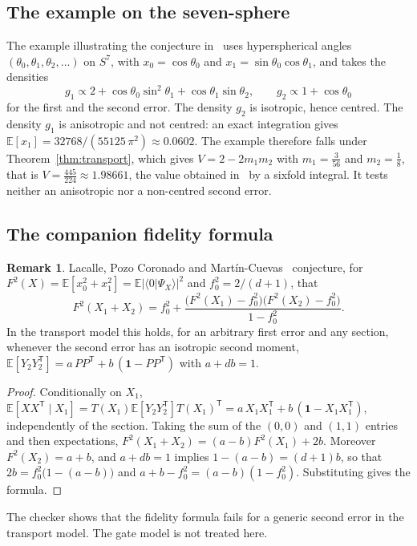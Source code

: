 \documentclass[11pt,a4paper]{article}
\theoremstyle{definition}
\newtheorem{remark}[theorem]{Remark}
\theoremstyle{plain}
\newcommand{\one}{\mathbf{1}}
\newcommand{\E}{\mathbb{E}}
\newcommand{\T}{\mathsf{T}}
\begin{document}
\subsection{The example on the seven-sphere}\label{sec:example}
The example illustrating the conjecture in~\cite{LacallePozo2019} uses
hyperspherical angles $(\theta_0,\theta_1,\theta_2,\dots)$ on $S^7$, with
$x_0=\cos\theta_0$ and $x_1=\sin\theta_0\cos\theta_1$, and takes the
densities
\[
g_1\propto2+\cos\theta_0\sin^2\theta_1+\cos\theta_1\sin\theta_2,\qquad
g_2\propto1+\cos\theta_0
\]
for the first and the second error. The density $g_2$ is isotropic, hence
centred. The density $g_1$ is anisotropic and not centred: an exact
integration gives $\E[x_1]=32768/(55125\,\pi^2)\approx0.0602$. The example
therefore falls under Theorem~\ref{thm:transport}, which gives
$V=2-2m_1m_2$ with $m_1=\tfrac3{56}$ and $m_2=\tfrac18$, that is
$V=\tfrac{445}{224}\approx1.98661$, the value obtained
in~\cite{LacallePozo2019} by a sixfold integral. It tests neither an
anisotropic nor a non-centred second error.

\subsection{The companion fidelity formula}

\begin{remark}\label{rem:fidelity}
Lacalle, Pozo Coronado and Mart\'in-Cuevas~\cite{LacallePozoMartin2026}
conjecture, for $F^2(X)=\E[x_0^2+x_1^2]=\E\lvert\langle0|\Psi_X\rangle\rvert^2$
and $f_0^2=2/(d+1)$, that
\[
F^2(X_1+X_2)=f_0^2+\frac{\bigl(F^2(X_1)-f_0^2\bigr)\bigl(F^2(X_2)-f_0^2\bigr)}{1-f_0^2}.
\]
In the transport model this holds, for an arbitrary first error and any
section, whenever the second error has an isotropic second moment,
$\E[Y_2Y_2^\T]=a\,PP^\T+b\,(\one-PP^\T)$ with $a+db=1$.
\end{remark}

\begin{proof}
Conditionally on $X_1$,
$\E[XX^\T\mid X_1]=T(X_1)\E[Y_2Y_2^\T]T(X_1)^\T
=a\,X_1X_1^\T+b\,(\one-X_1X_1^\T)$, independently of the section. Taking the
sum of the $(0,0)$ and $(1,1)$ entries and then expectations,
$F^2(X_1+X_2)=(a-b)F^2(X_1)+2b$. Moreover $F^2(X_2)=a+b$, and $a+db=1$
implies $1-(a-b)=(d+1)b$, so that $2b=f_0^2\bigl(1-(a-b)\bigr)$ and
$a+b-f_0^2=(a-b)(1-f_0^2)$. Substituting gives the formula.
\end{proof}

The checker shows that the fidelity formula fails for a generic second error
in the transport model. The gate model is not treated here.
\end{document}
